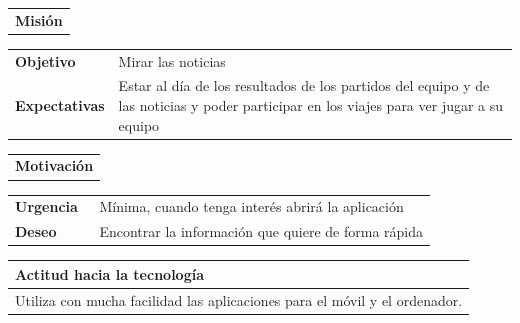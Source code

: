 \documentclass[11pt]{article}
\begin{document}
\begin{table}[H]
  \begin{tabular}{l}
    \textbf{Misión} 
  \end{tabular}
  
  \begin{tabular}{p{0.2\linewidth}|p{0.8\linewidth}}
    \toprule
    \textbf{Objetivo} & Mirar las noticias\\
    \textbf{Expectativas}  & Estar al día de los resultados de los partidos del equipo y de las noticias y poder participar en los viajes para ver jugar a su equipo\\
    \bottomrule
  \end{tabular}

  \begin{tabular}{l}
    \textbf{Motivación} 
  \end{tabular}

  \begin{tabular}{p{0.2\linewidth}|p{0.8\linewidth}}
    \toprule
    \textbf{Urgencia} & Mínima, cuando tenga interés abrirá la aplicación\\
    \textbf{Deseo}  & Encontrar la información que quiere de forma rápida \\
    \bottomrule
  \end{tabular}

  \begin{tabular}{p{1.028\linewidth}}
    \textbf{Actitud hacia la tecnología}\\
    \midrule
    Utiliza con mucha facilidad las aplicaciones para el móvil y el ordenador.
  \end{tabular}
\end{table}
\end{document}

